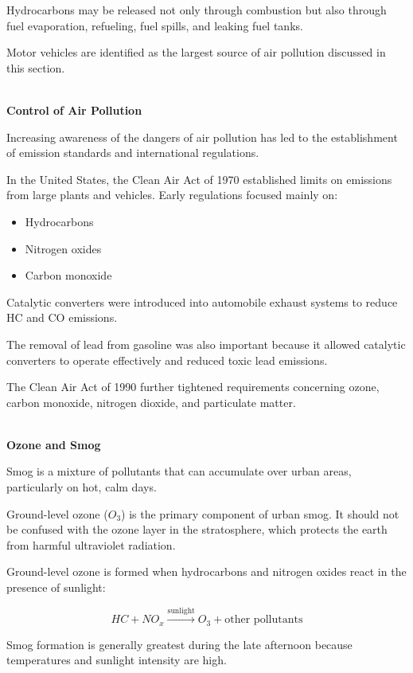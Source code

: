 \documentclass[12pt]{article}
\begin{document}
Hydrocarbons may be released not only through combustion but also through fuel evaporation, refueling, fuel spills, and leaking fuel tanks.

Motor vehicles are identified as the largest source of air pollution discussed in this section.

\textbf{\\ Control of Air Pollution}

Increasing awareness of the dangers of air pollution has led to the establishment of emission standards and international regulations.

In the United States, the Clean Air Act of 1970 established limits on emissions from large plants and vehicles. Early regulations focused mainly on:

\begin{itemize}
    \item Hydrocarbons
    \item Nitrogen oxides
    \item Carbon monoxide
\end{itemize}

Catalytic converters were introduced into automobile exhaust systems to reduce HC and CO emissions.

The removal of lead from gasoline was also important because it allowed catalytic converters to operate effectively and reduced toxic lead emissions.

The Clean Air Act of 1990 further tightened requirements concerning ozone, carbon monoxide, nitrogen dioxide, and particulate matter.

\textbf{\\ Ozone and Smog}

Smog is a mixture of pollutants that can accumulate over urban areas, particularly on hot, calm days.

Ground-level ozone ($O_3$) is the primary component of urban smog. It should not be confused with the ozone layer in the stratosphere, which protects the earth from harmful ultraviolet radiation.

Ground-level ozone is formed when hydrocarbons and nitrogen oxides react in the presence of sunlight:

\begin{equation*}
HC+NO_x
\xrightarrow{\text{sunlight}}
O_3+\text{other pollutants}
\end{equation*}

Smog formation is generally greatest during the late afternoon because temperatures and sunlight intensity are high.
\end{document}
